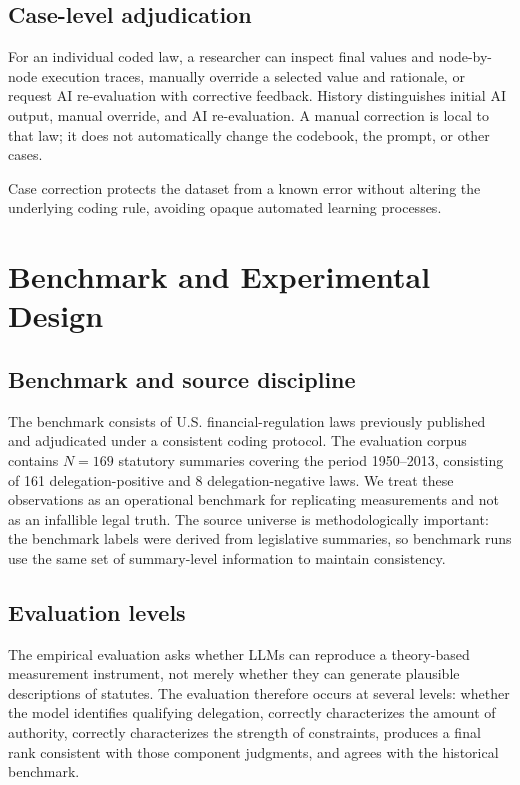 \documentclass[conference]{IEEEtran}
\begin{document}
\subsection{Case-level adjudication}

For an individual coded law, a researcher can inspect final values and node-by-node execution traces, manually override a selected value and rationale, or request AI re-evaluation with corrective feedback. History distinguishes initial AI output, manual override, and AI re-evaluation. A manual correction is local to that law; it does not automatically change the codebook, the prompt, or other cases.

Case correction protects the dataset from a known error without altering the underlying coding rule, avoiding opaque automated learning processes.

\section{Benchmark and Experimental Design}

\subsection{Benchmark and source discipline}

The benchmark consists of U.S. financial-regulation laws previously published and adjudicated under a consistent coding protocol. The evaluation corpus contains $N=169$ statutory summaries covering the period 1950--2013, consisting of 161 delegation-positive and 8 delegation-negative laws. We treat these observations as an operational benchmark for replicating measurements and not as an infallible legal truth. The source universe is methodologically important: the benchmark labels were derived from legislative summaries, so benchmark runs use the same set of summary-level information to maintain consistency.

\subsection{Evaluation levels}

The empirical evaluation asks whether LLMs can reproduce a theory-based measurement instrument, not merely whether they can generate plausible descriptions of statutes. The evaluation therefore occurs at several levels: whether the model identifies qualifying delegation, correctly characterizes the amount of authority, correctly characterizes the strength of constraints, produces a final rank consistent with those component judgments, and agrees with the historical benchmark.
\end{document}
